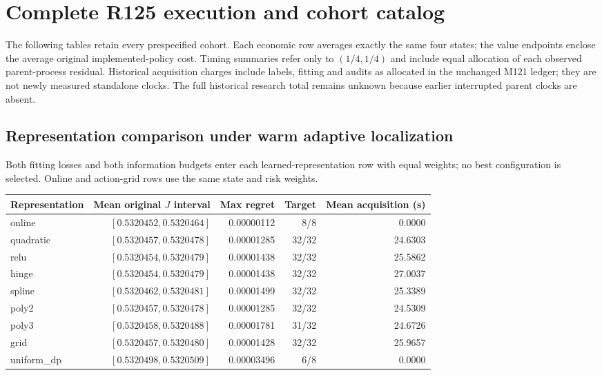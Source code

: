 \section{Complete R125 execution and cohort catalog}
\label{dev:results125}
The following tables retain every prespecified cohort. Each economic row averages exactly the same four states; the value endpoints enclose the average original implemented-policy cost. Timing summaries refer only to $(1/4,1/4)$ and include equal allocation of each observed parent-process residual. Historical acquisition charges include labels, fitting and audits as allocated in the unchanged M121 ledger; they are not newly measured standalone clocks. The full historical research total remains unknown because earlier interrupted parent clocks are absent.
\subsection{Representation comparison under warm adaptive localization}
Both fitting losses and both information budgets enter each learned-representation row with equal weights; no best configuration is selected. Online and action-grid rows use the same state and risk weights.
\begin{center}\small
\begin{tabular}{lrrrr}
\hline
Representation & Mean original $J$ interval & Max regret & Target & Mean acquisition (s) \\
\hline
online & $[0.5320452,0.5320464]$ & 0.00000112 & 8/8 & 0.0000 \\
quadratic & $[0.5320457,0.5320478]$ & 0.00001285 & 32/32 & 24.6303 \\
relu & $[0.5320454,0.5320479]$ & 0.00001438 & 32/32 & 25.5862 \\
hinge & $[0.5320454,0.5320479]$ & 0.00001438 & 32/32 & 27.0037 \\
spline & $[0.5320462,0.5320481]$ & 0.00001499 & 32/32 & 25.3389 \\
poly2 & $[0.5320457,0.5320478]$ & 0.00001285 & 32/32 & 24.5309 \\
poly3 & $[0.5320458,0.5320488]$ & 0.00001781 & 31/32 & 24.6726 \\
grid & $[0.5320457,0.5320480]$ & 0.00001428 & 32/32 & 25.9657 \\
uniform\_dp & $[0.5320498,0.5320509]$ & 0.00003496 & 6/8 & 0.0000 \\
\hline\end{tabular}\end{center}
